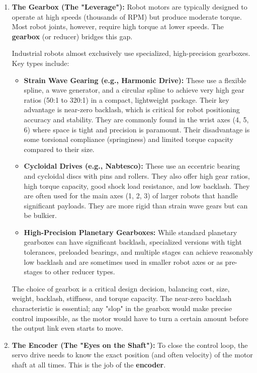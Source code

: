 \begin{enumerate}
    \item \textbf{The Gearbox (The "Leverage"):} Robot motors are typically designed to operate at high speeds (thousands of RPM) but produce moderate torque. Most robot joints, however, require high torque at lower speeds. The \textbf{gearbox} (or reducer) bridges this gap.
    
    Industrial robots almost exclusively use specialized, high-precision gearboxes. Key types include:
    \begin{itemize}
        \item \textbf{Strain Wave Gearing (e.g., Harmonic Drive\textsuperscript{\textregistered}):} These use a flexible spline, a wave generator, and a circular spline to achieve very high gear ratios (50:1 to 320:1) in a compact, lightweight package. Their key advantage is near-zero backlash, which is critical for robot positioning accuracy and stability. They are commonly found in the wrist axes (4, 5, 6) where space is tight and precision is paramount. Their disadvantage is some torsional compliance (springiness) and limited torque capacity compared to their size.
        \item \textbf{Cycloidal Drives (e.g., Nabtesco\textsuperscript{\textregistered}):} These use an eccentric bearing and cycloidal discs with pins and rollers. They also offer high gear ratios, high torque capacity, good shock load resistance, and low backlash. They are often used for the main axes (1, 2, 3) of larger robots that handle significant payloads. They are more rigid than strain wave gears but can be bulkier.
        \item \textbf{High-Precision Planetary Gearboxes:} While standard planetary gearboxes can have significant backlash, specialized versions with tight tolerances, preloaded bearings, and multiple stages can achieve reasonably low backlash and are sometimes used in smaller robot axes or as pre-stages to other reducer types.
        \end{itemize}
    The choice of gearbox is a critical design decision, balancing cost, size, weight, backlash, stiffness, and torque capacity. The near-zero backlash characteristic is essential; any "slop" in the gearbox would make precise control impossible, as the motor would have to turn a certain amount before the output link even starts to move.

    \item \textbf{The Encoder (The "Eyes on the Shaft"):} To close the control loop, the servo drive needs to know the exact position (and often velocity) of the motor shaft at all times. This is the job of the \textbf{encoder}.
    

\end{enumerate}
